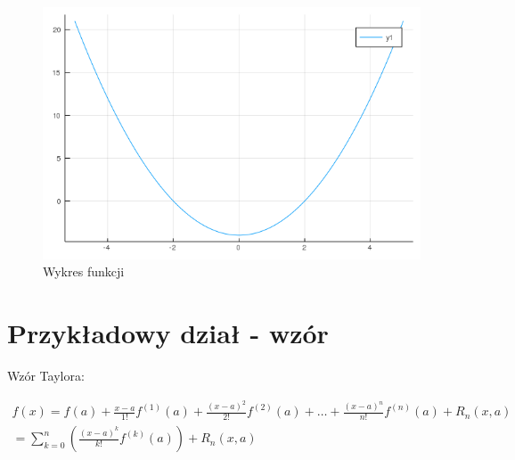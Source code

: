 \documentclass[11pt]{article}
\begin{document}
 
\begin{figure}[!htbp]
  \includegraphics[width=15cm]{figura.png}
  \centering
  \caption{Wykres funkcji}
  \label{fig:wykres1}
\end{figure}



\section{Przykładowy dział - wzór}
Wzór Taylora:

\begin{multline}
f(x) = f(a) + \frac{x-a}{1!}f^{(1)}(a) + \frac{(x-a)^2}{2!}f^{(2)}(a) + \dots + \frac{(x-a)^n}{n!}f^{(n)}(a) + R_n(x,a) \\
= \sum_{k=0}^n(\frac{(x-a)^k}{k!}f^{(k)}(a)) + R_n(x,a)
\end{multline}



    
\end{document}
